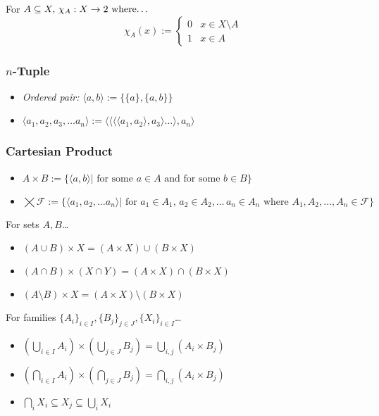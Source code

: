 \label{characteristicfucntion}
For $A \subseteq X, \, \chi_A : X \rightarrow 2 \textrm{ where\dots}$
\[\chi_A(x) := \begin{cases} 
      0 & x \in X \setminus A \\
      1 & x \in A 
   \end{cases} \]
	
\subsubsection{$n$-Tuple}\label{tuble}
\begin{itemize}
  \item \emph{Ordered pair:} $\langle a,b \rangle := \{\{a\}, \{a,b\}\}$
  \item $\langle a_1,a_2,a_3,\dots a_n \rangle := \langle \langle \langle \langle a_1, a_2 \rangle, a_3 \rangle \dots \rangle, a_n\rangle$
\end{itemize}
		
\subsubsection{Cartesian Product}\label{cartesianproduct}
\begin{itemize}
  \item $A \times B := \{ \langle a,b \rangle | \textrm{ for some }a\in A \textrm{ and for some } b \in B\}$
  \item \mbox{$\bigtimes \mathcal{F} := \{ \langle a_1,a_2, \dots a_n \rangle | \textrm{ for }a_1\in A_1, \, a_2 \in A_2, \dots \, a_n \in A_n \textrm{ where } A_1,A_2,\dots,A_n \in \mathcal{F}\}$}
\end{itemize}

\begin{proposition}
For sets $A,B$\dots
\begin{itemize}
  \item $(A \cup B) \times X = (A \times X) \cup (B \times X)$
  \item $(A \cap B) \times (X \cap Y) = (A \times X) \cap (B \times X)$
  \item $(A \setminus B) \times X = (A \times X) \setminus (B \times X)$
\end{itemize}
\end{proposition}

\begin{proposition}
For families $\{A_i\}_{i \in I},\{B_j\}_{j \in J},\{X_i\}_{i \in I}$\dots
\begin{itemize}
  \item $(\bigcup_{i \in I} A_i)\times (\bigcup_{j \in J} B_j) = \bigcup_{i,j}(A_i \times B_j)$
  \item $(\bigcap_{i \in I} A_i)\times (\bigcap_{j \in J} B_j) = \bigcap_{i,j}(A_i \times B_j)$
  \item $\bigcap_{i}X_i \subseteq X_j \subseteq \bigcup_{i}X_i$
\end{itemize}
\end{proposition}
			
